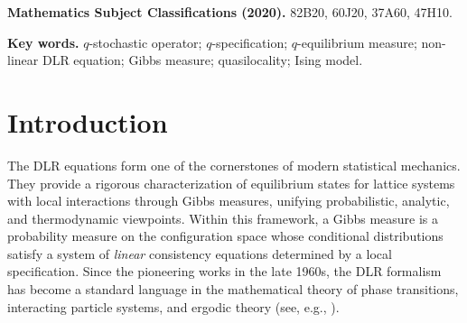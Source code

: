 \documentclass[11pt,reqno]{amsart}
\numberwithin{equation}{section} \setcounter{tocdepth}{1}
\begin{document}
	\begin{abstract} We introduce a {\it non-linear} generalization of the classical Dobrushin-Lanford-Ruelle (DLR) framework 
by developing the concept of a $q$-specification and the associated $q$-equilibrium measures. These objects arise naturally from a family of non-linear $q$-stochastic operators acting on the space of probability measures. A $q$-equilibrium measure is characterized as a fixed point of such operators, providing a non-linear analogue of the Gibbs equilibrium in the sense of DLR. We establish general conditions ensuring the existence and uniqueness of $q$-equilibrium measures and demonstrate how quasilocality plays a decisive role in their construction. Moreover, we exhibit examples of $q$-specifications with an empty set of $q$-equilibrium measures. We characterize the set of $q$-equilibrium measures by studying the dynamical systems generated by a class of 
$q$-stochastic operators. As a concrete application, we show that for the one-dimensional Ising model at sufficiently low temperatures, multiple $q$-equilibrium measures may exist, even though the classical Gibbs measure remains unique. Our results reveal that the $q$-specification formalism extends the DLR theory from linear to non-linear settings and opens a new direction in the study of Gibbs measures and equilibrium states of physical systems.
	\end{abstract}
	\maketitle
{\bf Mathematics Subject Classifications (2020).} 82B20, 60J20, 37A60, 47H10.

{\bf{Key words.}} $q$-stochastic operator; $q$-specification; $q$-equilibrium measure; non-linear DLR equation; Gibbs measure; quasilocality;  Ising model.

\tableofcontents
\section{Introduction}

The DLR equations form one of the cornerstones of modern statistical mechanics. 
They provide a rigorous characterization of equilibrium states for lattice systems with local interactions through Gibbs measures, 
unifying probabilistic, analytic, and thermodynamic viewpoints. 
Within this framework, a Gibbs measure is  a probability measure on the configuration space whose conditional distributions satisfy a system of \emph{linear} consistency equations determined by a local specification. 
Since the pioneering works in the late 1960s, the DLR formalism has become a standard language in the mathematical theory of phase transitions, interacting particle systems, and ergodic theory (see, e.g., \cite{Enter, FV, Ge, Rue}).
\end{document}
